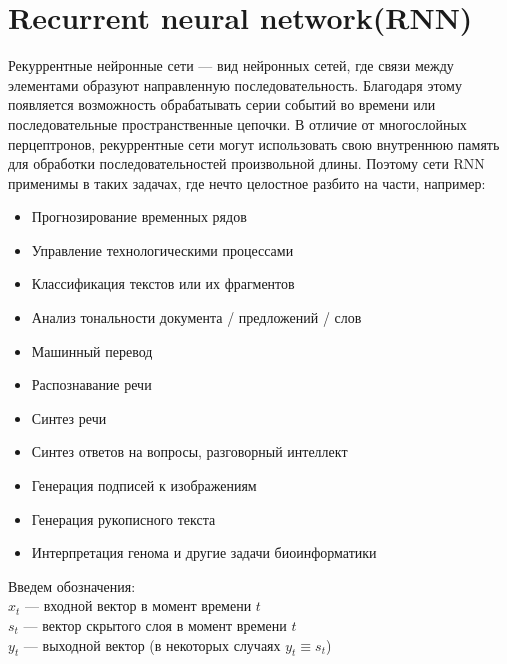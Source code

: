 \documentclass[11pt, oneside]{article}   	%
\begin{document}
	\newpage
	\section{Recurrent neural network(RNN)}
	Рекуррентные нейронные сети — вид нейронных сетей, где связи между элементами образуют направленную последовательность. Благодаря этому появляется возможность обрабатывать серии событий во времени или последовательные пространственные цепочки. В отличие от многослойных перцептронов, рекуррентные сети могут использовать свою внутреннюю память для обработки последовательностей произвольной длины. Поэтому сети RNN применимы в таких задачах, где нечто целостное разбито на части, например: 
	\begin{itemize}
		\item Прогнозирование временных рядов
		\item Управление технологическими процессами
		\item Классификация текстов или их фрагментов
		\item Анализ тональности документа / предложений / слов
		\item Машинный перевод
		\item Распознавание речи
		\item Синтез речи
		\item Синтез ответов на вопросы, разговорный интеллект
		\item Генерация подписей к изображениям
		\item Генерация рукописного текста
		\item Интерпретация генома и другие задачи биоинформатики
	\end{itemize}
	
	\newpage
	Введем обозначения:\\
	$x_t$ --- входной вектор в момент времени $t$\\
	$s_t$ --- вектор скрытого слоя в момент времени $t$\\
	$y_t$ --- выходной вектор (в некоторых случаях $y_t \equiv s_t$)
	
	\begin{figure}[h]
	\end{figure}
	
\end{document}
